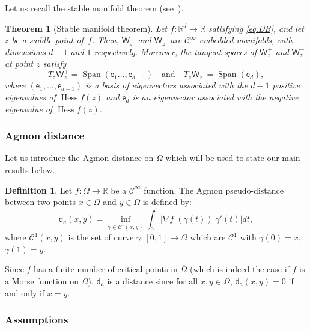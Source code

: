 \documentclass[JEP,XML,SOM,Unicode,NoEqCountersInSection,NoFloatCountersInSection,published]{cedram}
\newcommand{\quand}{\quad\text{and}\quad}
\DeclareMathOperator{\Span}{Span}
\DeclareMathOperator{\hess}{Hess}\let\Hess\hess
\theoremstyle{plain}
\newtheorem*{theorem*}{Theorem}
\theoremstyle{definition}
\newtheorem{definition}[proposition]{Definition}
\begin{document}
Let us recall the stable manifold theorem (see~\cite[Cor.\,6.4.1]{jost2008riemannian}).

\begin{theorem*}[Stable manifold theorem]
Let $f: \mathbb R^d\to \mathbb R$ satisfying \eqref{eq.DB}, and let $z$
be a saddle point of~$f$. Then, $\mathsf W_z^+ $ and $\mathsf
W_z^- $ are $\mathcal C^\infty$ embedded manifolds, with
dimensions $d-1$ and $1$ respectively.
Moreover, the tangent spaces of $\mathsf W_z^+ $ and $\mathsf
W_z^- $ at point $z$ satisfy
\[
T_z\mathsf W_z^+ =\Span (\mathsf e_1\ldots,\mathsf e_{d-1})
\quand T_z \mathsf W_z^- = \Span(\mathsf e_d),
\]
where $(\mathsf e_1,\ldots,\mathsf e_{d-1})$ is a basis of eigenvectors associated with the $d-1$ positive eigenvalues of $\hess f(z)$ and $\mathsf e_d$ is an eigenvector associated with the negative eigenvalue of $\hess f(z)$.
\end{theorem*}

\subsubsection*{Agmon distance} Let us introduce the Agmon distance on $\overline \Omega$ which will be used to state our main results below.


\begin{definition} \label{de.da} Let $f:\overline \Omega\to \mathbb R$ be a $\mathcal C^\infty$ function.
The Agmon pseudo-distance between two points $x\in \overline \Omega$ and $y \in \overline \Omega$ is defined by:
\[
\mathsf d_a\left(x,y\right)=\inf _{\gamma\in \mathcal C^1(x,y)} \int_0^1\vert \nabla f\vert (\gamma(t)) \left\vert \gamma'(t) \right\vert dt,
\]
where $\mathcal C^1\left(x,y\right)$ is the set of curve $\gamma:[0,1] \to \overline \Omega$ which are $\mathcal C^1$ with $\gamma(0)=x$, $\gamma(1)=y$.
\end{definition}
Since $f$ has a finite number of critical points in
$\overline \Omega$ (which is indeed the case if $f$ is a Morse function on
$\overline \Omega$), $\mathsf d_a$ is a distance since for all $x,y\in
\overline \Omega$, $\mathsf d_a(x,y)=0$ if and only if $x=y$.

\subsubsection{Assumptions}
\end{document}
